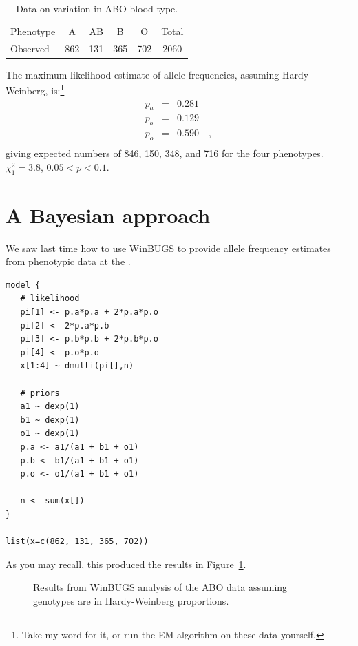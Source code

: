 \documentclass[12pt]{article}
\begin{document}
\begin{table}
\begin{center}
\begin{tabular}{lccccc}
Phenotype &   A &  AB &   B &   O & Total \\
Observed  & 862 & 131 & 365 & 702 & 2060
\end{tabular}
\end{center}
\caption{Data on variation in ABO blood type.}\label{table:abo-data}
\end{table}
The maximum-likelihood estimate of allele frequencies,
assuming Hardy-Weinberg, is:\footnote{Take my word for it, or run the
  EM algorithm on these data yourself.}
\begin{eqnarray*}
p_a &=& 0.281 \\
p_b &=& 0.129 \\
p_o &=& 0.590 \quad , \\
\end{eqnarray*}
giving expected numbers of 846, 150, 348, and 716 for the
four phenotypes. $\chi^2_1 = 3.8$, $0.05 < p < 0.1$.

\section*{A Bayesian approach}

We saw last time how to use WinBUGS to provide allele frequency
estimates from phenotypic data at the .
\begin{verbatim}
model {
   # likelihood 
   pi[1] <- p.a*p.a + 2*p.a*p.o
   pi[2] <- 2*p.a*p.b
   pi[3] <- p.b*p.b + 2*p.b*p.o
   pi[4] <- p.o*p.o
   x[1:4] ~ dmulti(pi[],n)

   # priors
   a1 ~ dexp(1)
   b1 ~ dexp(1)
   o1 ~ dexp(1)
   p.a <- a1/(a1 + b1 + o1)
   p.b <- b1/(a1 + b1 + o1)
   p.o <- o1/(a1 + b1 + o1)

   n <- sum(x[])
}

list(x=c(862, 131, 365, 702))
\end{verbatim}
As you may recall, this produced the results in
Figure~\ref{fig:multinomial-results}.

\begin{figure}
\caption{Results from WinBUGS analysis of the ABO
  data assuming genotypes are in Hardy-Weinberg proportions.}\label{fig:multinomial-results}
\end{figure}
\end{document}
